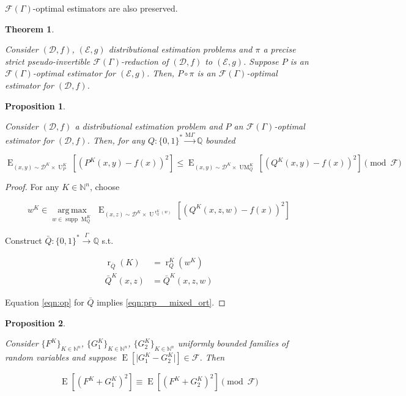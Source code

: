 \documentclass{article}
\numberwithin{equation}{section}
\theoremstyle{definition}
\theoremstyle{plain}
\newtheorem{theorem}{Theorem}[section]
\newtheorem{proposition}{Proposition}[section]
\newcommand{\Bool}{\{0,1\}}
\newcommand{\Words}{{\Bool^*}}
\DeclareMathOperator{\Supp}{supp}
\DeclareMathOperator{\E}{E}
\DeclareMathOperator{\R}{r}
\DeclareMathOperator{\M}{M}
\DeclareMathOperator{\UM}{UM}
\DeclareMathOperator{\Un}{U}
\newcommand{\Argmax}[1]{\underset{#1}{\operatorname{arg\,max}}\,}
\newcommand{\Nats}{\mathbb{N}}
\newcommand{\Rats}{\mathbb{Q}}
\newcommand{\Abs}[1]{\lvert #1 \rvert}
\newcommand{\Dist}{\mathcal{D}}
\newcommand{\MGrow}{\mathrm{M}\Gamma}
\newcommand{\Fall}{\mathcal{F}}
\newcommand{\EG}{\Fall(\Gamma)}
\newcommand{\Scheme}{\xrightarrow{\Gamma}}
\newcommand{\MScheme}{\xrightarrow{\MGrow}}
\begin{document}
$\EG$-optimal estimators are also preserved.

\begin{samepage}
\begin{theorem}
\label{thm:psp_reduce}

Consider $(\Dist,f)$, $(\mathcal{E},g)$ distributional estimation problems and $\pi$ a precise strict pseudo-invertible $\EG$-reduction of $(\Dist, f)$ to $(\mathcal{E}, g)$. Suppose $P$ is an $\EG$-optimal estimator for $(\mathcal{E}, g)$. Then, $P \circ \pi$ is an $\EG$-optimal estimator for $(\Dist, f)$.

\end{theorem}
\end{samepage}

\begin{samepage}
\begin{proposition}
\label{prp:mixed_opt}

Consider ${(\Dist,f)}$ a distributional estimation problem and ${P}$ an ${\EG}$-optimal estimator for ${(\Dist,f)}$. Then, for any $Q: \Words \MScheme \Rats$ bounded

\begin{equation}
\label{eqn:prp__mixed_ort}
\E_{(x,y) \sim \Dist^{K} \times \Un_P^K}[(P^K(x,y) - f(x))^2] \leq \E_{(x,y) \sim \Dist^{K} \times \UM_Q^K}[(Q^K(x,y)-f(x))^2] \pmod \Fall
\end{equation}

\end{proposition}
\end{samepage}

\begin{proof}

For any ${K \in \Nats^n}$, choose 

\[w^K \in \Argmax{w \in \Supp \M_Q^K} \E_{(x,z) \sim \Dist^{K} \times \Un^{\R_Q^K(w)}}[(Q^K(x,z,w)-f(x))^2]\]

Construct ${\bar{Q}: \Words \Scheme \Rats}$ s.t.

\begin{align*}
\R_{\bar{Q}}(K) &= \R_Q^K(w^K) \\
\bar{Q}^K(x,z) &= \bar{Q}^K(x,z,w)
\end{align*}

Equation \ref{eqn:op} for ${\bar{Q}}$ implies \ref{eqn:prp__mixed_ort}.
%
\end{proof}

\begin{samepage}
\begin{proposition}
\label{prp:sq_diff_cong}

Consider $\{F^K\}_{K \in \Nats^n}$, $\{G_1^K\}_{K \in \Nats^n}$, $\{G_2^K\}_{K \in \Nats^n}$ uniformly bounded families of random variables and suppose ${\E[\Abs{G_1^K - G_2^K}] \in \Fall}$. Then

\begin{equation}
\E[(F^K + G_1^K)^2] \equiv \E[(F^K + G_2^K)^2] \pmod \Fall
\end{equation}

\end{proposition}
\end{samepage}
\end{document}
